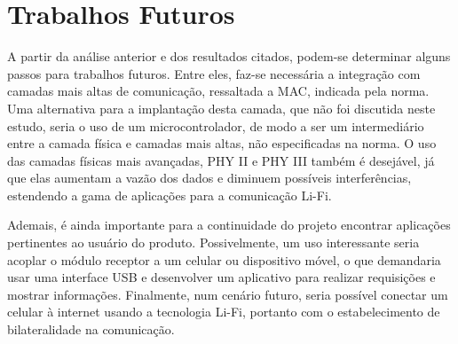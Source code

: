 	\section{Trabalhos Futuros}
	
	A partir da análise anterior e dos resultados citados, podem-se determinar alguns passos para trabalhos futuros. Entre eles, faz-se necessária a integração com camadas mais altas de comunicação, ressaltada a MAC, indicada pela norma. Uma alternativa para a implantação desta camada, que não foi discutida neste estudo, seria o uso de um microcontrolador, de modo a ser um intermediário entre a camada física e camadas mais altas, não especificadas na norma. O uso das camadas físicas mais avançadas, PHY II e PHY III também é desejável, já que elas aumentam a vazão dos dados e diminuem possíveis interferências, estendendo a gama de aplicações para a comunicação Li-Fi.
	
	Ademais, é ainda importante para a continuidade do projeto encontrar aplicações pertinentes ao usuário do produto. Possivelmente, um uso interessante seria acoplar o módulo receptor a um celular ou dispositivo móvel, o que demandaria usar uma interface USB e desenvolver um aplicativo para realizar requisições e mostrar informações. Finalmente, num cenário futuro, seria possível conectar um celular à internet usando a tecnologia Li-Fi, portanto com o estabelecimento de bilateralidade na comunicação.
